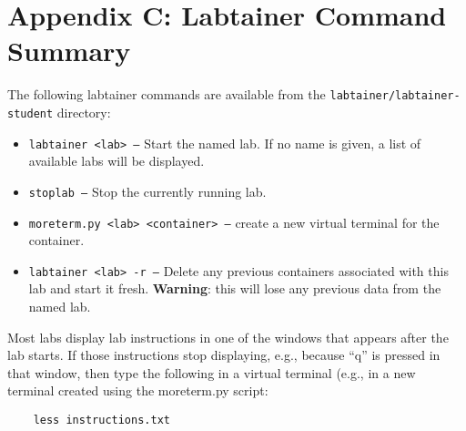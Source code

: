 \documentclass[12pt]{article}
\begin{document}
\section {Appendix C: Labtainer Command Summary}
\label{sec:appendixC}
The following labtainer commands are available from the \texttt{labtainer/labtainer-student}
directory:
\begin{itemize}
\item \texttt{labtainer <lab> --}
Start the named lab.  If no name is given, a list of available labs will be displayed.
\item \texttt{stoplab  --} Stop the currently running lab.
\item \texttt{moreterm.py <lab> <container> --} create a new virtual terminal for the container.
\item \texttt{labtainer <lab> -r --}
Delete any previous containers associated with this lab and start it fresh.  \textbf{Warning}: this will lose any
previous data from the named lab.
\end{itemize}

Most labs display lab instructions in one of the windows that appears after the lab starts.  If those instructions
stop displaying, e.g., because ``q'' is pressed in that window, then type the following in a virtual terminal (e.g.,
in a new terminal created using the moreterm.py script:
\begin{verbatim}
    less instructions.txt
\end{verbatim}
\end{document}
